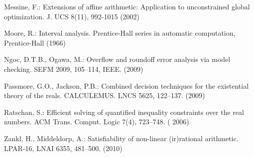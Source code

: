 \documentclass[runningheads,a4paper,oribibl]{llncs}
\begin{document}
\begin{thebibliography}{10}
Messine, F.: Extensions of affine arithmetic: Application to unconstrained
  global optimization.  J. UCS 8(11), 992-1015 (2002)

Moore, R.: Interval analysis. Prentice-Hall series in automatic computation,
  Prentice-Hall (1966)

Ngoc, D.T.B., Ogawa, M.: Overflow and roundoff error analysis via model
  checking. 
  SEFM 2009, 105--114, IEEE. (2009)

Passmore, G.O., Jackson, P.B.: Combined decision techniques for the existential
  theory of the reals. CALCULEMUS. LNCS 5625, 122--137. (2009)

Ratschan, S.: Efficient solving of quantified inequality constraints over the
  real numbers. ACM Trans. Comput. Logic  7(4),  723--748. ( 2006)

Zankl, H., Middeldorp, A.: Satisfiability of non-linear (ir)rational
arithmetic. LPAR-16, LNAI 6355, 481--500. (2010)
\end{thebibliography}
\end{document}
